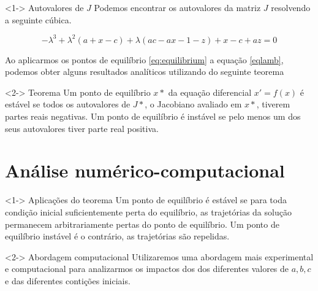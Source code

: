\documentclass{beamer}
\begin{document}
\begin{frame}
		
	\begin{exampleblock}
		<1-> {Autovalores de $J$} 
		Podemos encontrar os autovalores da matriz $J$ resolvendo a seguinte cúbica.

		\begin{equation}
			-\lambda^3+\lambda^2(a+x-c) + \lambda(ac-ax-1-z)+x-c+az =0
			\label{eqlamb}
		\end{equation}
	
		Ao aplicarmos os pontos de equilíbrio \ref{eq:equilibrium} a equação \ref{eqlamb}, podemos 
		obter alguns resultados analíticos utilizando do seguinte teorema
	\end{exampleblock}
	
	\begin{exampleblock}
		<2-> {Teorema}
Um ponto de equilíbrio $x*$ da equação diferencial $x' = f(x)$ é estável se todos os autovalores de $J*$, 
o Jacobiano avaliado em $x*$, tiverem partes reais negativas. Um ponto de equilíbrio é instável se 
pelo menos um dos seus autovalores tiver parte real positiva.
	\end{exampleblock}

\end{frame}



\section{Análise numérico-computacional}

\begin{frame}

	\begin{exampleblock}
		<1-> {Aplicações do teorema}
		Um ponto de equilíbrio é estável se para toda condição inicial suficientemente
		perta do equilíbrio, as trajetórias da solução permanecem arbitrariamente pertas
		do ponto de equilíbrio. Um ponto de equilíbrio instável é o contrário, as 
		trajetórias são repelidas.
	\end{exampleblock}

	
	\begin{exampleblock}
		<2-> {Abordagem computacional}
		Utilizaremos uma abordagem mais experimental e computacional para analizarmos 
		os impactos dos dos diferentes valores de $a, b, c$ e das diferentes contições 
		iniciais. 
	\end{exampleblock}
	
\end{frame}
\end{document}
